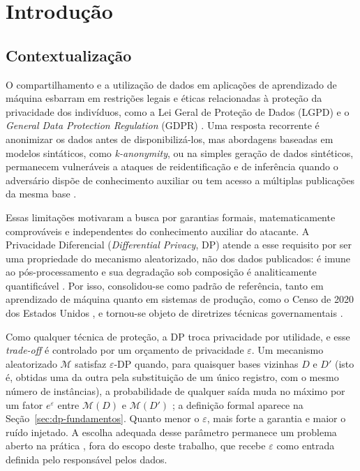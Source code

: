 \chapter{Introdução}
\label{chap:introducao}

\section{Contextualização}
\label{sec:contextualizacao}

O compartilhamento e a utilização de dados em aplicações de aprendizado de máquina esbarram em restrições legais e éticas relacionadas à proteção da privacidade dos indivíduos, como a Lei Geral de Proteção de Dados (LGPD) \cite{ref01b} e o \textit{General Data Protection Regulation} (GDPR) \cite{ref01}. Uma resposta recorrente é anonimizar os dados antes de disponibilizá-los, mas abordagens baseadas em modelos sintáticos, como \textit{k-anonymity}, ou na simples geração de dados sintéticos, permanecem vulneráveis a ataques de reidentificação e de inferência quando o adversário dispõe de conhecimento auxiliar \cite{ref03,ref14} ou tem acesso a múltiplas publicações da mesma base \cite{ref12}.

Essas limitações motivaram a busca por garantias formais, matematicamente comprováveis e independentes do conhecimento auxiliar do atacante. A Privacidade Diferencial (\textit{Differential Privacy}, DP) \cite{ref02,ref16} atende a esse requisito por ser uma propriedade do mecanismo aleatorizado, não dos dados publicados: é imune ao pós-processamento e sua degradação sob composição é analiticamente quantificável \cite{ref20}. Por isso, consolidou-se como padrão de referência, tanto em aprendizado de máquina \cite{ref17} quanto em sistemas de produção, como o Censo de 2020 dos Estados Unidos \cite{ref51,ref41}, e tornou-se objeto de diretrizes técnicas governamentais \cite{ref18,ref20}.

Como qualquer técnica de proteção, a DP troca privacidade por utilidade, e esse \textit{trade-off} é controlado por um orçamento de privacidade $\varepsilon$. Um mecanismo aleatorizado $\mathcal{M}$ satisfaz $\varepsilon$-DP quando, para quaisquer bases vizinhas $D$ e $D'$ (isto é, obtidas uma da outra pela substituição de um único registro, com o mesmo número de instâncias), a probabilidade de qualquer saída muda no máximo por um fator $e^{\varepsilon}$ entre $\mathcal{M}(D)$ e $\mathcal{M}(D')$ \cite{ref02,ref04}; a definição formal aparece na Seção~\ref{sec:dp-fundamentos}. Quanto menor o $\varepsilon$, mais forte a garantia e maior o ruído injetado. A escolha adequada desse parâmetro permanece um problema aberto na prática \cite{ref20}, fora do escopo deste trabalho, que recebe $\varepsilon$ como entrada definida pelo responsável pelos dados.

